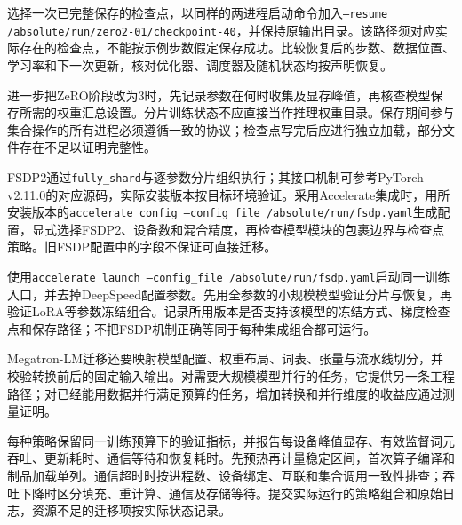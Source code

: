 选择一次已完整保存的检查点，以同样的两进程启动命令加入\texttt{--resume /absolute/run/zero2-01/checkpoint-40}，并保持原输出目录。该路径须对应实际存在的检查点，不能按示例步数假定保存成功。比较恢复后的步数、数据位置、学习率和下一次更新，核对优化器、调度器及随机状态均按声明恢复。

进一步把ZeRO阶段改为3时，先记录参数在何时收集及显存峰值，再核查模型保存所需的权重汇总设置。分片训练状态不应直接当作推理权重目录。保存期间参与集合操作的所有进程必须遵循一致的协议；检查点写完后应进行独立加载，部分文件存在不足以证明完整性。

FSDP2通过\texttt{fully\_shard}与逐参数分片组织执行；其接口机制可参考PyTorch v2.11.0的对应源码\cite{pytorch2026fsdp2}，实际安装版本按目标环境验证。采用Accelerate集成时，用所安装版本的\texttt{accelerate config --config\_file /absolute/run/fsdp.yaml}生成配置，显式选择FSDP2、设备数和混合精度，再检查模型模块的包裹边界与检查点策略。旧FSDP配置中的字段不保证可直接迁移。

使用\texttt{accelerate launch --config\_file /absolute/run/fsdp.yaml}启动同一训练入口，并去掉DeepSpeed配置参数。先用全参数的小规模模型验证分片与恢复，再验证LoRA等参数冻结组合。记录所用版本是否支持该模型的冻结方式、梯度检查点和保存路径；不把FSDP机制正确等同于每种集成组合都可运行。

Megatron-LM迁移还要映射模型配置、权重布局、词表、张量与流水线切分，并校验转换前后的固定输入输出。对需要大规模模型并行的任务，它提供另一条工程路径；对已经能用数据并行满足预算的任务，增加转换和并行维度的收益应通过测量证明。

每种策略保留同一训练预算下的验证指标，并报告每设备峰值显存、有效监督词元吞吐、更新耗时、通信等待和恢复耗时。先预热再计量稳定区间，首次算子编译和制品加载单列。通信超时时按进程数、设备绑定、互联和集合调用一致性排查；吞吐下降时区分填充、重计算、通信及存储等待。提交实际运行的策略组合和原始日志，资源不足的迁移项按实际状态记录。
